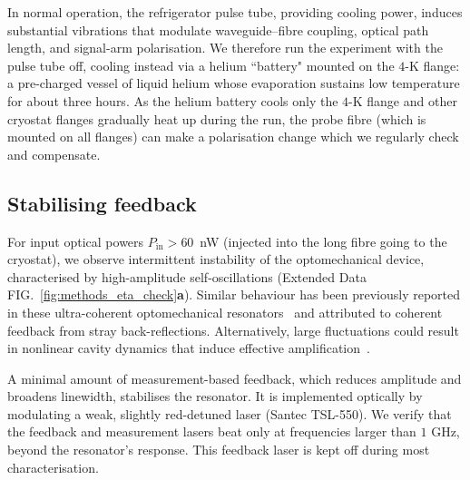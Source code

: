 \documentclass[./Main-revtex.tex]{subfiles}
\begin{document}
In normal operation, the refrigerator pulse tube, providing cooling power, induces substantial vibrations that modulate waveguide–fibre coupling, optical path length, and signal-arm polarisation. We therefore run the experiment with the pulse tube off, cooling instead via a helium ``battery" mounted on the $4$-K flange: a pre-charged vessel of liquid helium whose evaporation sustains low temperature for about three hours. As the helium battery cools only the $4$-K flange and other cryostat flanges gradually heat up during the run, the probe fibre (which is mounted on all flanges) can make a polarisation change which we regularly check and compensate.

\subsection{Stabilising feedback}
\label{sec:methods:setup_feedback}
For input optical powers $P_\text{in} > 60$~nW (injected into the long fibre going to the cryostat), 
we observe intermittent instability of the optomechanical device, characterised by high-amplitude self-oscillations (Extended Data FIG.~\ref{fig:methods_eta_check}\textbf{a}). Similar behaviour has been previously reported in these ultra-coherent optomechanical resonators~\cite{guo2021bringing} and attributed to coherent feedback from stray back-reflections. Alternatively, large fluctuations could result in nonlinear cavity dynamics that induce effective amplification~\cite{aspelmeyer2014cavity}. 

A minimal amount of measurement-based feedback, which reduces amplitude and broadens linewidth, stabilises the resonator. It is implemented optically by modulating a weak, slightly red-detuned laser (Santec TSL-550). 
We verify that
the feedback and measurement lasers beat only at frequencies larger than $1$ GHz, beyond the resonator’s response. This feedback laser is kept off during most characterisation.
\end{document}
